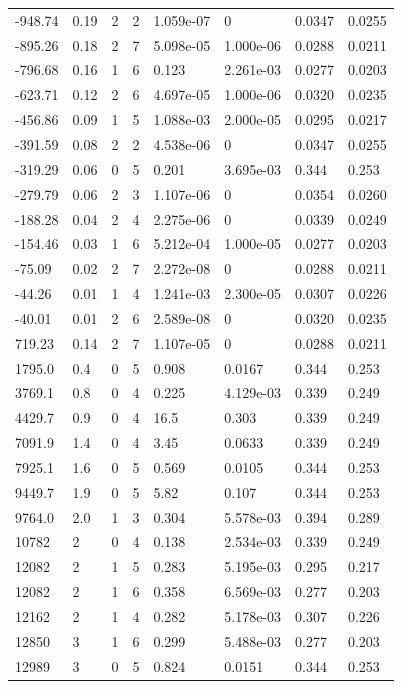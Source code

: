 \documentclass[preview]{standalone}
\begin{document}
{{\begin{tabular}{L{1.2cm}C{1.2cm} C{0.3cm}C{0.5cm} C{1.4cm}C{1.4cm} C{1.4cm}C{1.4cm}}
  -948.74  &  0.19  & 2     &  2 &  1.059e-07  & 0  & 0.0347 &  0.0255   \\ 
  -895.26  &  0.18  & 2     &  7 &  5.098e-05  & 1.000e-06  & 0.0288 &  0.0211   \\ 
  -796.68  &  0.16  & 1     &  6 &  0.123  & 2.261e-03  & 0.0277 &  0.0203   \\ 
  -623.71  &  0.12  & 2     &  6 &  4.697e-05  & 1.000e-06  & 0.0320 &  0.0235   \\ 
  -456.86  &  0.09  & 1     &  5 &  1.088e-03  & 2.000e-05  & 0.0295 &  0.0217   \\ 
  -391.59  &  0.08  & 2     &  2 &  4.538e-06  & 0  & 0.0347 &  0.0255   \\ 
  -319.29  &  0.06  & 0     &  5 &  0.201  & 3.695e-03  & 0.344 &  0.253   \\ 
  -279.79  &  0.06  & 2     &  3 &  1.107e-06  & 0  & 0.0354 &  0.0260   \\ 
  -188.28  &  0.04  & 2     &  4 &  2.275e-06  & 0  & 0.0339 &  0.0249   \\ 
  -154.46  &  0.03  & 1     &  6 &  5.212e-04  & 1.000e-05  & 0.0277 &  0.0203   \\ 
  -75.09  &  0.02  & 2     &  7 &  2.272e-08  & 0  & 0.0288 &  0.0211   \\ 
  -44.26  &  0.01  & 1     &  4 &  1.241e-03  & 2.300e-05  & 0.0307 &  0.0226   \\ 
  -40.01  &  0.01  & 2     &  6 &  2.589e-08  & 0  & 0.0320 &  0.0235   \\ 
  719.23  &  0.14  & 2     &  7 &  1.107e-05  & 0  & 0.0288 &  0.0211   \\ 
  1795.0  &   0.4  & 0     &  5 &  0.908  & 0.0167  & 0.344 &  0.253   \\ 
  3769.1  &   0.8  & 0     &  4 &  0.225  & 4.129e-03  & 0.339 &  0.249   \\ 
  4429.7  &   0.9  & 0     &  4 &  16.5  & 0.303  & 0.339 &  0.249   \\ 
  7091.9  &   1.4  & 0     &  4 &  3.45  & 0.0633  & 0.339 &  0.249   \\ 
  7925.1  &   1.6  & 0     &  5 &  0.569  & 0.0105  & 0.344 &  0.253   \\ 
  9449.7  &   1.9  & 0     &  5 &  5.82  & 0.107  & 0.344 &  0.253   \\ 
  9764.0  &   2.0  & 1     &  3 &  0.304  & 5.578e-03  & 0.394 &  0.289   \\ 
  10782  &     2  & 0     &  4 &  0.138  & 2.534e-03  & 0.339 &  0.249   \\ 
  12082  &     2  & 1     &  5 &  0.283  & 5.195e-03  & 0.295 &  0.217   \\ 
  12082  &     2  & 1     &  6 &  0.358  & 6.569e-03  & 0.277 &  0.203   \\ 
  12162  &     2  & 1     &  4 &  0.282  & 5.178e-03  & 0.307 &  0.226   \\ 
  12850  &     3  & 1     &  6 &  0.299  & 5.488e-03  & 0.277 &  0.203   \\ 
  12989  &     3  & 0     &  5 &  0.824  & 0.0151  & 0.344 &  0.253   \\ 
\hline 
\end{tabular} 

}}
\end{document}

